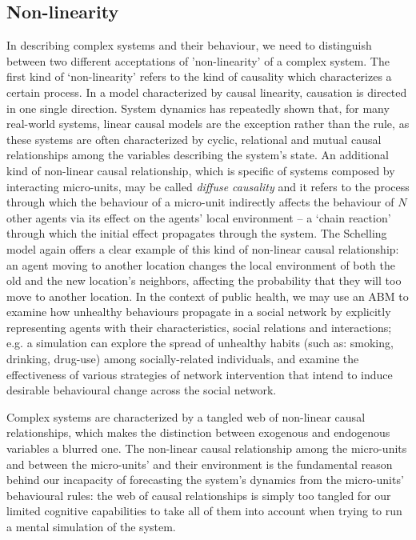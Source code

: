 \documentclass[review]{elsarticle}
\begin{document}
\subsection{Non-linearity}
In describing complex systems and their behaviour, we need to distinguish between two different acceptations of 'non-linearity' of a complex system. The first kind of `non-linearity' refers to the kind of causality which characterizes a certain process. In a model characterized by causal linearity, causation is directed in one single direction. System dynamics has repeatedly shown that, for many real-world systems, linear causal models are the exception rather than the rule, as these systems are often characterized by cyclic, relational and mutual causal relationships among the variables describing the system's state. An additional kind of non-linear causal relationship, which is specific of systems composed by interacting micro-units, may be called \textit{diffuse causality} and it refers to the process through which the behaviour of a micro-unit indirectly affects the behaviour of $N$ other agents via its effect on the agents' local environment -- a `chain reaction' through which the initial effect propagates through the system. The Schelling model again offers a clear example of this kind of non-linear causal relationship: an agent moving to another location changes the local environment of both the old and the new location's neighbors, affecting the probability that they will too move to another location. In the context of public health, we may use an ABM to examine how unhealthy behaviours propagate in a social network by explicitly representing agents with their characteristics, social relations and interactions; e.g. a simulation can explore the spread of unhealthy habits (such as: smoking, drinking, drug-use) among socially-related individuals, and examine the effectiveness of various strategies of network intervention that intend to induce desirable behavioural change across the social network.

Complex systems are characterized by a tangled web of non-linear causal relationships, which makes the distinction between exogenous and endogenous variables a blurred one. The non-linear causal relationship among the micro-units and between the micro-units' and their environment is the fundamental reason behind our incapacity of forecasting the system's dynamics from the micro-units' behavioural rules: the web of causal relationships is simply too tangled for our limited cognitive capabilities to take all of them into account when trying to run a mental simulation of the system. 
\end{document}
